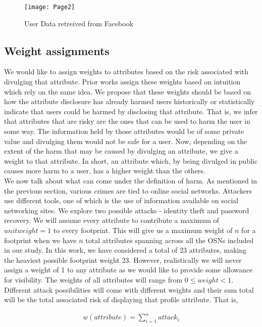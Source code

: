\documentclass[10pt,conference]{IEEEtran}
\begin{document}
	\begin{figure*}[t]
  		\caption{User Data retreived from Facebook}
		\centering
		\texttt{[image: Page2]}
  	\end{figure*}

\subsection{Weight assignments}
We would like to assign weights to attributes based on the risk associated with divulging that attribute. Prior works assign these weights based on intuition which rely on the same idea. We propose that these weights should be based on how the attribute disclosure has already harmed users historically or statistically indicate that users could be harmed by disclosing that attribute. That is, we infer that attributes that are risky are the ones that can be used to harm the user in some way. The information held by those attributes would be of some private value and divulging them would not be safe for a user. Now, depending on the extent of the harm that may be caused by divulging an attribute, we give a weight to that attribute. In short, an attribute which, by being divulged in public causes more harm to a user, has a higher weight than the others. \\

We now talk about what can come under the definition of harm. As mentioned in the previous section, various crimes are tied to online social networks. Attackers use different tools, one of which is the use of information available on social networking sites. We explore two possible attacks - identity theft and password recovery. We will assume every attribute to contribute a maximum of $ unit weight = 1 $ to every footprint. This will give us a maximum weight of $  n $ for a footprint when we have $ n $ total attributes spanning across all the OSNs included in our study. In this work, we have considered a total of 23 attributes, making the heaviest possible footprint weight 23. However, realistically we will never assign a weight of 1 to any attribute as we would like to provide some allowance for visibility. The weights of all attributes will range from $ 0 \leq weight < 1 $. Different attack possibilities will come with different weights and their sum total will be the total associated risk of displaying that profile attribute. That is,

\begin{align*}
w(attribute) = \sum_{i=1}^{n}attack_i
\end{align*}
\end{document}
